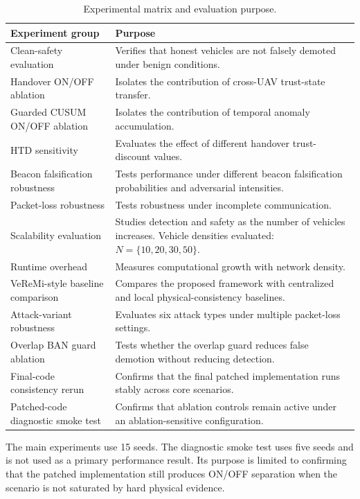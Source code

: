 \documentclass[journal]{IEEEtran}
\begin{document}
\begin{table}[!t]
\centering
\caption{Experimental matrix and evaluation purpose.}
\label{tab:experimental_matrix}
\begin{tabularx}{\textwidth}{l X}
\toprule
\textbf{Experiment group} & \textbf{Purpose} \\
\midrule
Clean-safety evaluation & Verifies that honest vehicles are not falsely demoted under benign conditions. \\
Handover ON/OFF ablation & Isolates the contribution of cross-UAV trust-state transfer. \\
Guarded CUSUM ON/OFF ablation & Isolates the contribution of temporal anomaly accumulation. \\
HTD sensitivity & Evaluates the effect of different handover trust-discount values. \\
Beacon falsification robustness & Tests performance under different beacon falsification probabilities and adversarial intensities. \\
Packet-loss robustness & Tests robustness under incomplete communication. \\
Scalability evaluation & Studies detection and safety as the number of vehicles increases. Vehicle densities evaluated: $N=\{10,20,30,50\}$. \\
Runtime overhead & Measures computational growth with network density. \\
VeReMi-style baseline comparison & Compares the proposed framework with centralized and local physical-consistency baselines. \\
Attack-variant robustness & Evaluates six attack types under multiple packet-loss settings. \\
Overlap BAN guard ablation & Tests whether the overlap guard reduces false demotion without reducing detection. \\
Final-code consistency rerun & Confirms that the final patched implementation runs stably across core scenarios. \\
Patched-code diagnostic smoke test & Confirms that ablation controls remain active under an ablation-sensitive configuration. \\
\bottomrule
\end{tabularx}
\end{table}

The main experiments use 15 seeds. The diagnostic smoke test uses five seeds and is not used as a primary performance result. Its purpose is limited to confirming that the patched implementation still produces ON/OFF separation when the scenario is not saturated by hard physical evidence.
\end{document}
